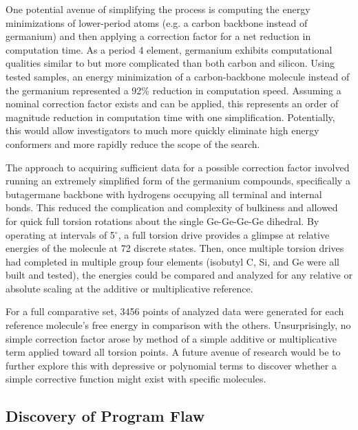 One potential avenue of simplifying the process is computing the energy minimizations of lower-period atoms (e.g. a carbon backbone instead of germanium) and then applying a correction factor for a net reduction in computation time.
As a period 4 element, germanium exhibits computational qualities similar to but more complicated than both carbon and silicon.
Using tested samples, an energy minimization of a carbon-backbone molecule instead of the germanium represented a 92\% reduction in computation speed.
Assuming a nominal correction factor exists and can be applied, this represents an order of magnitude reduction in computation time with one simplification. 
Potentially, this would allow investigators to much more quickly eliminate high energy conformers and more rapidly reduce the scope of the search.

The approach to acquiring sufficient data for a possible correction factor involved running an extremely simplified form of the germanium compounds, specifically a butagermane backbone with hydrogens occupying all terminal and internal bonds.
This reduced the complication and complexity of bulkiness and allowed for quick full torsion rotations about the single Ge-Ge-Ge-Ge dihedral.
By operating at intervals of 5$^{\circ}$, a full torsion drive provides a glimpse at relative energies of the molecule at 72 discrete states. 
Then, once multiple torsion drives had completed in multiple group four elements (isobutyl C, Si, and Ge were all built and tested), the energies could be compared and analyzed for any relative or absolute scaling at the additive or multiplicative reference. 

For a full comparative set, 3456 points of analyzed data were generated for each reference molecule's free energy in comparison with the others. 
Unsurprisingly, no simple correction factor arose by method of a simple additive or multiplicative term applied toward all torsion points. 
A future avenue of research would be to further explore this with depressive or polynomial terms to discover whether a simple corrective function might exist with specific molecules.

\subsection{Discovery of Program Flaw}













